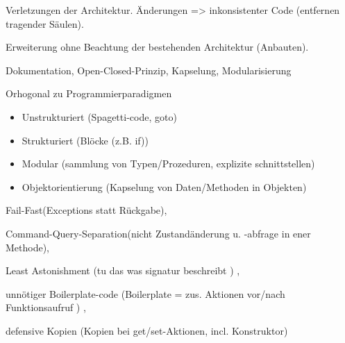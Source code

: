Verletzungen der Architektur. Änderungen => inkonsistenter Code (entfernen tragender Säulen).

Erweiterung ohne Beachtung der bestehenden Architektur (Anbauten).

 Dokumentation, Open-Closed-Prinzip, Kapselung, Modularisierung

Orhogonal zu Programmierparadigmen
\begin{itemize}
\item Unstrukturiert (Spagetti-code, goto)
\item Strukturiert (Blöcke (z.B. if))
\item Modular (sammlung von Typen/Prozeduren, explizite schnittstellen)
\item Objektorientierung (Kapselung von Daten/Methoden in Objekten)
\end{itemize}

Fail-Fast(Exceptions statt Rückgabe), 

Command-Query-Separation(nicht Zustandänderung u. -abfrage in ener Methode), 

Least Astonishment (tu das was signatur beschreibt ) , 

unnötiger Boilerplate-code (Boilerplate = zus. Aktionen vor/nach Funktionsaufruf ) , 

defensive Kopien (Kopien bei get/set-Aktionen, incl. Konstruktor)


